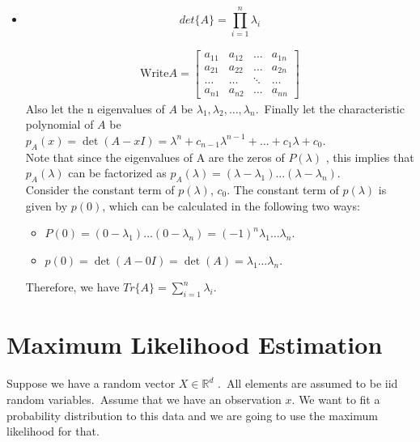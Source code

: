 \documentclass[12pt]{article}
\begin{document}
\begin{itemize}
\begin{qsolve}
          \end{qsolve}
    \item \begin{equation*}
              det\{A\} = \prod_{i=1}^n \lambda_i
          \end{equation*}
          \begin{qsolve}
              \begin{align*}
                  \text{Write} A = \begin{bmatrix}
                      a_{11} & a_{12} & \hdots & a_{1n} \\
                      a_{21} & a_{22} & \hdots & a_{2n} \\
                      \hdots & \hdots & \ddots & \hdots \\
                      a_{n1} & a_{n2} & \hdots & a_{nn}
                  \end{bmatrix}
              \end{align*}
              Also let the n eigenvalues of $A$ be $\lambda_1, \lambda_2, \ldots, \lambda_n$.\, Finally let the characteristic polynomial of $A$ be $p_A(x) = \det(A - xI) = \lambda^n + c_{n-1} \lambda^{n-1} + \hdots + c_1 \lambda + c_0$. \\
              Note that since the eigenvalues of A are the zeros of $P(\lambda)$ , this implies that $p_A(\lambda)$ can be factorized as $p_A(\lambda) = (\lambda - \lambda_1) \hdots (\lambda - \lambda_n)$. \\
              Consider the constant term of $p(\lambda)$, $c_0$. The constant term of $p(\lambda)$ is given by $p(0)$, which can be calculated in the following two ways:
              \begin{itemize}
                  \item $P(0) = (0 - \lambda_1) \hdots (0 - \lambda_n) = (-1)^n \lambda_1 \hdots \lambda_n$.
                  \item $p(0) = \det(A-0I) = \det(A) = \lambda_1 \hdots \lambda_n$.
              \end{itemize}
              Therefore, we have $Tr\{A\} = \sum_{i=1}^n \lambda_i$.
          \end{qsolve}
\end{itemize}

\section{Maximum Likelihood Estimation}
Suppose we have a random vector $X \in \mathbb{R}^d$ .\, All elements are assumed to be iid random variables.\, Assume that we have an observation $x$. We want to fit a probability distribution to this data and we are going to use the maximum likelihood for that.
\end{document}

